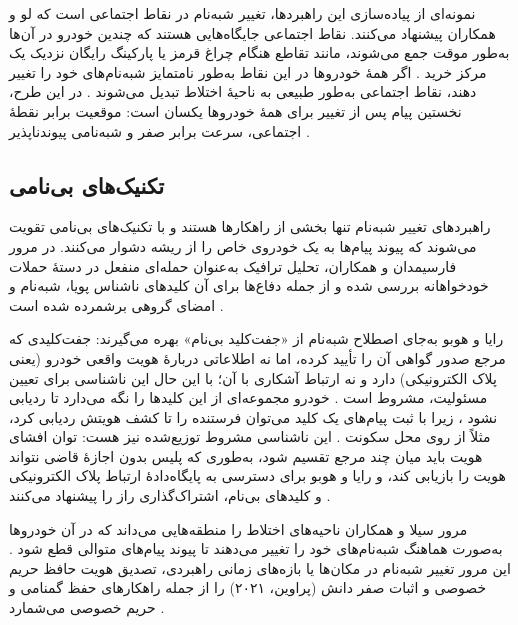 \documentclass[12pt,a4paper]{article}
\begin{document}
نمونه‌ای از پیاده‌سازی این راهبردها، تغییر شبه‌نام در نقاط اجتماعی است که لو و همکاران پیشنهاد می‌کنند. نقاط اجتماعی جایگاه‌هایی هستند که چندین خودرو در آن‌ها به‌طور موقت جمع می‌شوند، مانند تقاطع هنگام چراغ قرمز یا پارکینگ رایگان نزدیک یک مرکز خرید \cite{luPseudonymChangingSocial2012}. اگر همهٔ خودرو‌ها در این نقاط به‌طور نامتمایز شبه‌نام‌های خود را تغییر دهند، نقاط اجتماعی به‌طور طبیعی به ناحیهٔ اختلاط تبدیل می‌شوند \cite{luPseudonymChangingSocial2012}. در این طرح، نخستین پیام پس از تغییر برای همهٔ خودرو‌ها یکسان است: موقعیت برابر نقطهٔ اجتماعی، سرعت برابر صفر و شبه‌نامی پیوندناپذیر \cite{luPseudonymChangingSocial2012}.

\subsection{تکنیک‌های بی‌نامی}

راهبرد‌های تغییر شبه‌نام تنها بخشی از راهکار‌ها هستند و با تکنیک‌های بی‌نامی تقویت می‌شوند که پیوند پیام‌ها به یک خودروی خاص را از ریشه دشوار می‌کنند. در مرور فارسیمدان و همکاران، تحلیل ترافیک به‌عنوان حمله‌ای منفعل در دستهٔ حملات خودخواهانه بررسی شده و از جمله دفاع‌ها برای آن کلید‌های ناشناس پویا، شبه‌نام و امضای گروهی برشمرده شده است \cite{farsimadanReviewSecurityChallenges2025}.

رایا و هوبو به‌جای اصطلاح شبه‌نام از «جفت‌کلید بی‌نام» بهره می‌گیرند: جفت‌کلیدی که مرجع صدور گواهی آن را تأیید کرده، اما نه اطلاعاتی دربارهٔ هویت واقعی خودرو (یعنی پلاک الکترونیکی) دارد و نه ارتباط آشکاری با آن؛ با این حال این ناشناسی برای تعیین مسئولیت، مشروط است \cite{SecuringVehicularAd}. خودرو مجموعه‌ای از این کلید‌ها را نگه می‌دارد تا ردیابی نشود \cite{SecuringVehicularAd}، زیرا با ثبت پیام‌های یک کلید می‌توان فرستنده را تا کشف هویتش ردیابی کرد، مثلاً از روی محل سکونت \cite{SecuringVehicularAd}. این ناشناسی مشروط توزیع‌شده نیز هست: توان افشای هویت باید میان چند مرجع تقسیم شود، به‌طوری که پلیس بدون اجازهٔ قاضی نتواند هویت را بازیابی کند، و رایا و هوبو برای دسترسی به پایگاه‌دادهٔ ارتباط پلاک الکترونیکی و کلید‌های بی‌نام، اشتراک‌گذاری راز  را پیشنهاد می‌کنند \cite{SecuringVehicularAd}.

مرور سیلا و همکاران ناحیه‌های اختلاط را منطقه‌هایی می‌داند که در آن خودرو‌ها به‌صورت هماهنگ شبه‌نام‌های خود را تغییر می‌دهند تا پیوند پیام‌های متوالی قطع شود \cite{VanetSecurityPrivacy}. این مرور تغییر شبه‌نام در مکان‌ها یا بازه‌های زمانی راهبردی، تصدیق هویت حافظ حریم خصوصی و اثبات صفر دانش (پراوین، ۲۰۲۱) را از جمله راهکار‌های حفظ گمنامی و حریم خصوصی می‌شمارد \cite{VanetSecurityPrivacy}.
\end{document}
